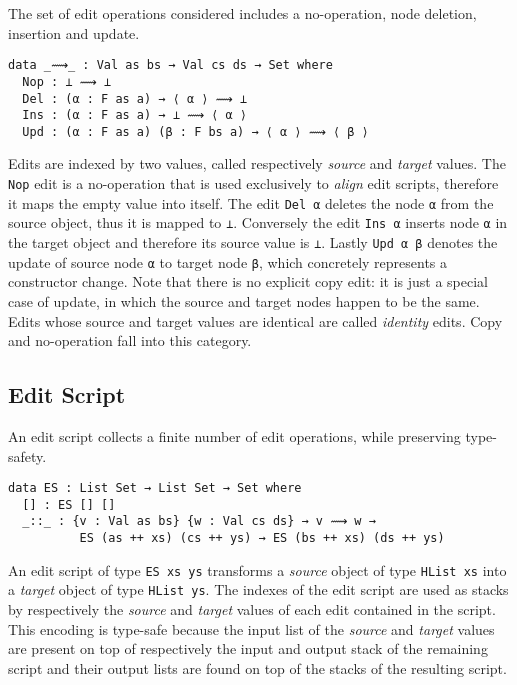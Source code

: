 \documentclass[preprint]{sigplanconf}
\theoremstyle{plain}
\begin{document}
	The set of edit operations considered includes a no-operation, node 
	deletion, insertion and update.
\begin{verbatim}
data _⟿_ : Val as bs → Val cs ds → Set where
  Nop : ⊥ ⟿ ⊥
  Del : (α : F as a) → ⟨ α ⟩ ⟿ ⊥
  Ins : (α : F as a) → ⊥ ⟿ ⟨ α ⟩
  Upd : (α : F as a) (β : F bs a) → ⟨ α ⟩ ⟿ ⟨ β ⟩
\end{verbatim}
	Edits are indexed by two values, called respectively 
	\emph{source} and \emph{target} values. The \texttt{Nop} edit is 
	a no-operation that is used exclusively to \emph{align} edit scripts,
	therefore it maps the empty value into itself.
	The edit \texttt{Del α} deletes the node \texttt{α} from the source object, 
	thus it is mapped to \texttt{⊥}. Conversely the edit \texttt{Ins α} 
	inserts node \texttt{α} in the target object and therefore its source value 
	is 	\texttt{⊥}.
	Lastly \texttt{Upd α β} denotes the update of source node \texttt{α}
	to target node \texttt{β}, which concretely represents a 
	constructor change. 
	Note that there is no explicit copy edit: it is just a special case 
	of update, in which the source and target nodes happen to be the same.
	Edits whose source and target values are identical are 
	called \emph{identity} edits. Copy and no-operation fall into this
	category.
	
	\subsection{Edit Script}
        \label{subsec:edit-script}
	An edit script collects a finite number of edit operations, 
	while preserving type-safety. 
\begin{verbatim}
data ES : List Set → List Set → Set where
  [] : ES [] []
  _::_ : {v : Val as bs} {w : Val cs ds} → v ⟿ w → 
          ES (as ++ xs) (cs ++ ys) → ES (bs ++ xs) (ds ++ ys)
\end{verbatim}	
	An edit script of type \texttt{ES xs ys} transforms
	a \emph{source} object of type \texttt{HList xs} into
	a \emph{target} object of type \texttt{HList ys}. 
        The indexes of the edit script are used as stacks by respectively the 
        \emph{source} and \emph{target} values of each edit contained in the script.
        This encoding is type-safe because the input list of the \emph{source} and 
        \emph{target} values are present on top of respectively the input and output 
        stack of the remaining script and their output lists are 
        found on top of the stacks of the resulting script.
\end{document}
